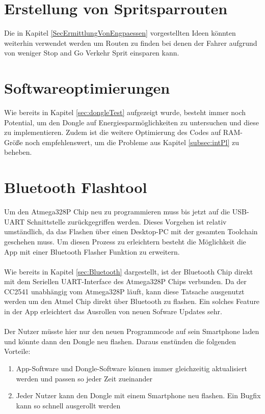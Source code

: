 \section{Erstellung von Spritsparrouten}
Die in Kapitel \ref{SecErmittlungVonEngpaessen} vorgestellten Ideen könnten weiterhin verwendet werden um Routen zu finden bei denen der Fahrer aufgrund von weniger Stop and Go Verkehr Sprit einsparen kann.

\section{Softwareoptimierungen}
Wie bereits in Kapitel \ref{sec:dongleTest} aufgezeigt wurde, besteht immer noch Potential, um den Dongle auf Energiesparmöglichkeiten zu untersuchen und diese zu implementieren. Zudem ist die weitere Optimierung des Codes auf RAM-Größe noch empfehlenswert, um die Probleme aus Kapitel \ref{subsec:intPl} zu beheben.

\section{Bluetooth Flashtool}
\label{sec:appAusblick}
Um den Atmega328P Chip neu zu programmieren muss bis jetzt auf die USB-UART Schnittstelle zurückgegriffen werden. Dieses Vorgehen ist relativ umständlich, da das Flashen über einen Desktop-PC mit der gesamten Toolchain geschehen muss. Um diesen Prozess zu erleichtern besteht die Möglichkeit die App mit einer Bluetooth Flasher Funktion zu erweitern.
\paragraph{}
Wie bereits in Kapitel \ref{sec:Bluetooth} dargestellt, ist der Bluetooth Chip direkt mit dem Seriellen UART-Interface des Atmega328P Chips verbunden. Da der CC2541 unabhängig vom Atmega328P läuft, kann diese Tatsache ausgenutzt werden um den Atmel Chip direkt über Bluetooth zu flashen. Ein solches Feature in der App erleichtert das Ausrollen von neuen Sofware Updates sehr.
\paragraph{}
Der Nutzer müsste hier nur den neuen Programmcode auf sein Smartphone laden und könnte dann den Dongle neu flashen. 
Daraus enstünden die folgenden Vorteile: 
\begin{enumerate}
	\item App-Software und Dongle-Software können immer gleichzeitig aktualisiert werden und passen so jeder Zeit zueinander
	\item Jeder Nutzer kann den Dongle mit einem Smartphone neu flashen. Ein Bugfix kann so schnell ausgerollt werden 
\end{enumerate}
